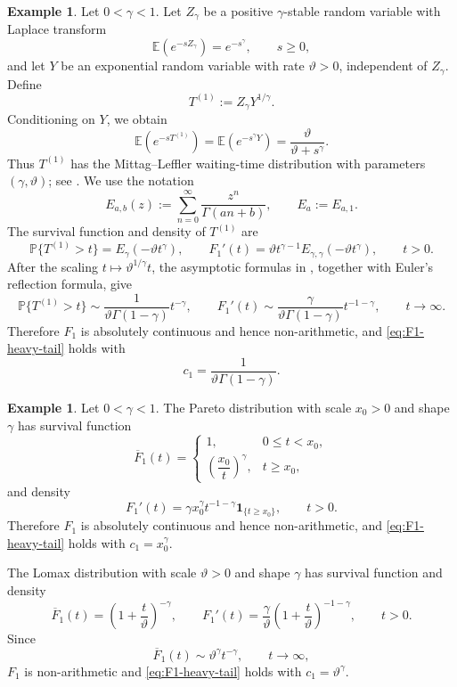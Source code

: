 \documentclass[reqno,final,11pt]{amsart}
\newcommand{\E}{\mathbb E}
\newcommand{\Pbb}{\mathbb P}
\newcommand{\ind}[1]{\mathbf 1_{\{#1\}}}
\theoremstyle{plain}
\theoremstyle{definition}
\newtheorem{example}[theorem]{Example}
\theoremstyle{remark}
\numberwithin{equation}{section}
\begin{document}
\begin{example}\label{ex:AA-type-one-lifetime}
Let \(0<\gamma<1\). Let \(Z_\gamma\) be a positive \(\gamma\)-stable random variable with Laplace transform
\[
  \E\!\left(e^{-sZ_\gamma}\right)=e^{-s^\gamma},
  \qquad s\ge0,
\]
and let \(Y\) be an exponential random variable with rate \(\vartheta>0\), independent of \(Z_\gamma\). Define
\[
  T^{(1)}:=Z_\gamma Y^{1/\gamma}.
\]
Conditioning on \(Y\), we obtain
\[
  \E\!\left(e^{-sT^{(1)}}\right)
  =\E\!\left(e^{-s^\gamma Y}\right)
  =\frac{\vartheta}{\vartheta+s^\gamma}.
\]
Thus \(T^{(1)}\) has the Mittag--Leffler waiting-time distribution with parameters \((\gamma,\vartheta)\); see \cite[(1.3)--(1.6) and (2.41)--(2.42), with \(\delta=1\)]{CahoyPolito2013}. We use the notation
\[
  E_{a,b}(z):=\sum_{n=0}^{\infty}\frac{z^n}{\Gamma(an+b)},
  \qquad E_a:=E_{a,1}.
\]
The survival function and density of \(T^{(1)}\) are
\[
  \Pbb\{T^{(1)}>t\}=E_\gamma(-\vartheta t^\gamma),
  \qquad
  F_1'(t)=\vartheta t^{\gamma-1}E_{\gamma,\gamma}(-\vartheta t^\gamma),
  \qquad t>0.
\]
After the scaling \(t\mapsto\vartheta^{1/\gamma}t\), the asymptotic formulas in \cite[(4.5)--(4.6)]{MainardiGorenfloVivoli2005}, together with Euler's reflection formula, give
\[
  \Pbb\{T^{(1)}>t\}
  \sim\frac{1}{\vartheta\Gamma(1-\gamma)}t^{-\gamma},
  \qquad
  F_1'(t)
  \sim\frac{\gamma}{\vartheta\Gamma(1-\gamma)}t^{-1-\gamma},
  \qquad t\to\infty.
\]
Therefore \(F_1\) is absolutely continuous and hence non-arithmetic, and \eqref{eq:F1-heavy-tail} holds with
\[
  c_1=\frac{1}{\vartheta\Gamma(1-\gamma)}.
\]
\end{example}

\begin{example}\label{ex:pareto-lomax}
Let \(0<\gamma<1\). The Pareto distribution with scale \(x_0>0\) and shape \(\gamma\) has survival function
\[
  \overline F_1(t)=
  \begin{cases}
    1, & 0\le t<x_0,\\
    \left(\dfrac{x_0}{t}\right)^\gamma, & t\ge x_0,
  \end{cases}
\]
and density
\[
  F_1'(t)=\gamma x_0^\gamma t^{-1-\gamma}\ind{t\ge x_0},
  \qquad t>0.
\]
Therefore \(F_1\) is absolutely continuous and hence non-arithmetic, and \eqref{eq:F1-heavy-tail} holds with \(c_1=x_0^\gamma\).

The Lomax distribution with scale \(\vartheta>0\) and shape \(\gamma\) has survival function and density
\[
  \overline F_1(t)=\left(1+\frac{t}{\vartheta}\right)^{-\gamma},
  \qquad
  F_1'(t)=\frac{\gamma}{\vartheta}
  \left(1+\frac{t}{\vartheta}\right)^{-1-\gamma},
  \qquad t>0.
\]
Since
\[
  \overline F_1(t)\sim\vartheta^\gamma t^{-\gamma},
  \qquad t\to\infty,
\]
\(F_1\) is non-arithmetic and \eqref{eq:F1-heavy-tail} holds with \(c_1=\vartheta^\gamma\).
\end{example}
\end{document}
